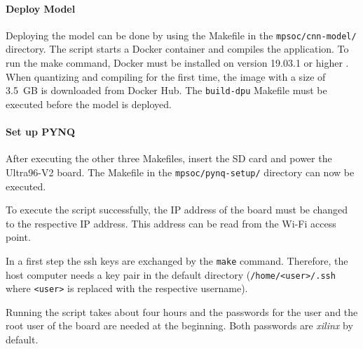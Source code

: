 \paragraph{Deploy Model}
Deploying the model can be done by using the Makefile in the \texttt{mpsoc/cnn-model/} directory.
The script starts a Docker container and compiles the application.
To run the make command, Docker must be installed on version 19.03.1 or higher \cite{vitis_ai_user_guide}.
When quantizing and compiling for the first time, the image with a size of \SI{3.5}{GB} is downloaded from Docker Hub.
The \texttt{build-dpu} Makefile must be executed before the model is deployed.

\paragraph{Set up PYNQ}
After executing the other three Makefiles, insert the SD card and power the Ultra96-V2 board.
The Makefile in the \texttt{mpsoc/pynq-setup/} directory can now be executed.

To execute the script successfully, the IP address of the board must be changed to the respective IP address.
This address can be read from the Wi-Fi access point.

In a first step the \acrshort{ssh} keys are exchanged by the \texttt{make} command.
Therefore, the host computer needs a key pair in the default directory (\texttt{/home/<user>/.ssh} where \texttt{<user>} is replaced with the respective username).

Running the script takes about four hours and the passwords for the user and the root user of the board are needed at the beginning.
Both passwords are \textit{xilinx} by default.
